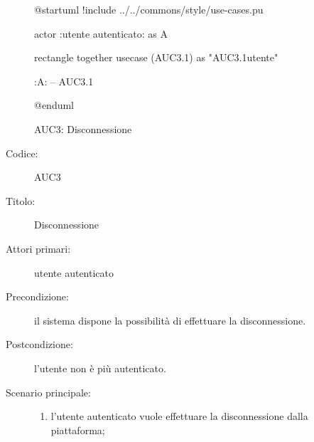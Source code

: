 \documentclass[../../../analisi-dei-requisiti.tex]{subfiles}
\begin{document}
\begin{figure}[h!]
  \centering
  \begin{plantuml}
  @startuml
  !include ../../commons/style/use-cases.pu

  actor :utente autenticato: as A

  rectangle {
    together {
      usecase (AUC3.1) as "AUC3.1\nDisconnessione utente"
    }
  }

  :A: -- AUC3.1

  @enduml
  \end{plantuml}
  \caption{AUC3: Disconnessione}
  \label{fig:auc3}
\end{figure}

\begin{description}
  \item[Codice:] AUC3
  \item[Titolo:] Disconnessione
  \item[Attori primari:] utente autenticato
  \item[Precondizione:] il sistema dispone la possibilità di effettuare la disconnessione.
  \item[Postcondizione:] l'utente non è più autenticato.
  \item[Scenario principale:]
  \begin{enumerate}
    \item l'utente autenticato vuole effettuare la disconnessione dalla piattaforma;
  \end{enumerate}
\end{description}
\end{document}
